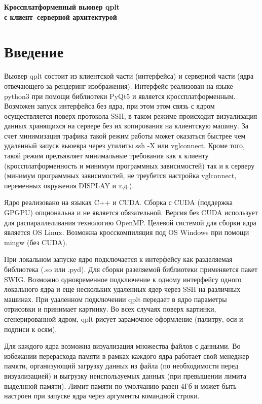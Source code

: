 \documentclass[12pt]{article}
\begin{document}
\begin{center}
  \bf\LARGE Кроссплатформенный вьювер qplt \\ с клиент--серверной архитектурой
\end{center}

\tableofcontents

\section{Введение}
Вьювер qplt  состоит из клиентской части (интерфейса)
и серверной части (ядра отвечающего за рендеринг изображения). Интерфейс реализован на языке python3 при помощи библиотеки PyQt5 и является кроссплатформенным.
Возможен запуск интерфейса без ядра, при этом этом связь с ядром осуществляется поверх протокола SSH,
в таком режиме происходит визуализация данных хранящихся на сервере без их копирования на клиентскую машину.
За счет минимизация трафика такой режим работы может оказаться быстрее чем удаленный запуск вьюевра через утилиты ssh -X или vglconnect.
Кроме того, такой режим предъявляет минимальные требования как к клиенту (кроссплатформенность и минимум программных зависимостей)
так и к серверу (минимум программных зависимостей, не треубется настройка vglconnect, переменных окружения DISPLAY и т.д.).


Ядро реализовано на языках C++ и CUDA. Сборка с CUDA (поддержка GPGPU) опциональна и не является обязательной.
Версия без CUDA использует для распараллеливания технологию OpenMP.
Целевой системой для сборки ядра является OS Linux. Возможна кросскомпиляция под OS Windows при помощи mingw (без CUDA).

При локальном запуске ядро подключается к интерфейсу как разделяемая библиотека (.so или .pyd). Для сборки разеляемой библиотеки применяется пакет SWIG. 
Возможно одновременное подключение к одному интерфейсу одного локального ядра и еще нескольких удаленных ядер через  SSH на различных машинах.
При удаленном подключении qplt передает в ядро параметры отрисовки и принимает картинку. Во всех случаях поверх картинки, сгенерированной ядром,
qplt рисует зарамочное оформление (палитру, оси и подписи к осям).


Для каждого ядра возможна визуализация множества файлов с данными. Во избежании перерасхода памяти в рамках каждого ядра работает свой менеджер памяти,
организующий загрузку данных из файла (по необходимости перед визуализацией) и выгрузку неиспользуемых данных (при превышении лимита выделнной памяти). 
Лимит памяти по умолчанию равен 4Гб и может быть настроен при запуске ядра через аргументы командной строки.
\end{document}
